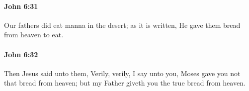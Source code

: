 		\paragraph{John 6:31} %
			\label{JOHN-6-31}

			Our fathers did eat manna in the desert; as it is written, He gave them bread from heaven to eat.

			\begin{framed}
			\scriptsize
				\begin{compactdesc}
					\item[SBLG] 
				\end{compactdesc}
			\end{framed}

		\paragraph{John 6:32} %
			\label{JOHN-6-32}

			Then Jesus said unto them, Verily, verily, I say unto you, Moses gave you not that bread from heaven; but my Father giveth you the true bread from heaven.

